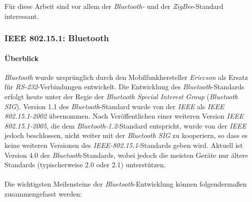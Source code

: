             Für diese Arbeit sind vor allem der \emph{Bluetooth-} und der \emph{ZigBee}-Standard interessant. 

        \subsubsection{IEEE 802.15.1: Bluetooth}\label{Bluetooth}
            \paragraph{Überblick}
                \emph{Bluetooth} wurde ursprünglich durch den Mobilfunkhersteller \emph{Ericcson} als Ersatz für
                \emph{RS-232}-Verbindungen entwickelt. Die Entwicklung des \emph{Bluetooth}-Standards erfolgt
                heute unter der Regie der \emph{Bluetooth Special Interest Group} (\emph{Bluetooth SIG}).
                Version 1.1 des \emph{Bluetooth}-Standard wurde 
                von der \emph{IEEE} als \emph{IEEE 802.15.1-2002} übernommen. Nach Veröffentlichen einer
                weiteren Version \emph{IEEE 802.15.1-2005}, die dem \emph{Bluetooth-1.2}-Standard entspricht,
                wurde von der \emph{IEEE} jedoch beschlossen, nicht weiter mit der \emph{Bluetooth SIG}
                zu kooperiern, so dass es keine weiteren Versionen des \emph{IEEE-802.15.1}-Standards 
                geben wird. Aktuell ist Version 4.0 des \emph{Bluetooth}-Standards, wobei jedoch die
                meisten Geräte nur ältere Standards (typischerweise 2.0 oder 2.1) unterstützen. \cite{Bluetooth} 
                \\
                    \\
                Die wichtigsten Meilensteine der \emph{Bluetooth}-Entwicklung können folgendermaßen
                zusammengefasst werden:

